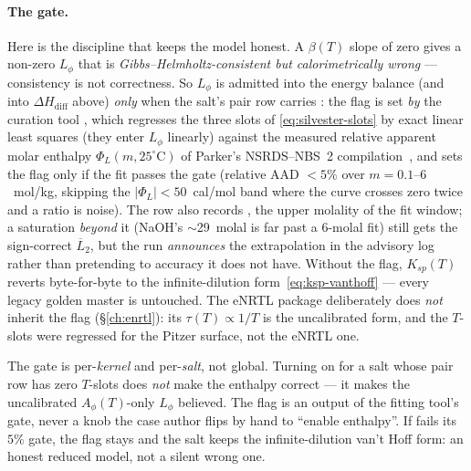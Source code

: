 \documentclass[11pt,a4paper]{article}
\begin{document}
\paragraph{The  gate.}  Here is the discipline that
keeps the model honest.  A $\beta(T)$ slope of zero gives a non-zero
$L_\phi$ that is \emph{Gibbs--Helmholtz-consistent but calorimetrically
wrong} --- consistency is not correctness.  So $L_\phi$ is admitted into
the energy balance (and into $\Delta H_{\text{diff}}$ above) \emph{only}
when the salt's pair row carries : the flag is
set \emph{by} the curation tool ,
which regresses the three slots of \eqref{eq:silvester-slots} by exact
linear least squares (they enter $L_\phi$ linearly) against the measured
relative apparent molar enthalpy $\Phi_L(m,25^\circ\mathrm C)$ of Parker's
NSRDS--NBS~2 compilation~\cite{Parker1965}, and sets the flag only if the
fit passes the gate (relative AAD $<5\%$ over $m=0.1$--$6$~mol/kg, skipping
the $|\Phi_L|<50$~cal/mol band where the curve crosses zero twice and a
ratio is noise).  The row also records , the upper
molality of the fit window; a saturation \emph{beyond} it
(NaOH's $\sim$29~molal is far past a $6$-molal fit) still gets the
sign-correct $\overline{L}_2$, but the run \emph{announces} the
extrapolation in the advisory log rather than pretending to accuracy it
does not have.  Without the flag, $K_{sp}(T)$ reverts byte-for-byte to the
infinite-dilution form~\eqref{eq:ksp-vanthoff} --- every legacy golden
master is untouched.  The eNRTL package deliberately does \emph{not}
inherit the flag (\S\ref{ch:enrtl}): its $\tau(T)\propto1/T$ is the
uncalibrated form, and the $T$-slots were regressed for the Pitzer surface,
not the eNRTL one.

\begin{pitfall}
The gate is per-\emph{kernel} and per-\emph{salt}, not global.  Turning on
 for a salt whose pair row has zero $T$-slots does
\emph{not} make the enthalpy correct --- it makes the uncalibrated
$A_\phi(T)$-only $L_\phi$ believed.  The flag is an output of the fitting
tool's gate, never a knob the case author flips by hand to ``enable
enthalpy''.  If  fails its $5\%$ gate, the flag
stays  and the salt keeps the infinite-dilution van't Hoff
form: an honest reduced model, not a silent wrong one.
\end{pitfall}
\end{document}
